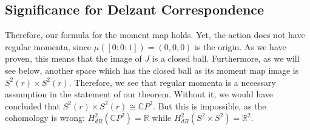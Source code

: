 \subsection{Significance for Delzant Correspondence}

\begin{remark}
Therefore, our formula for the moment map holds. Yet, the action does not have regular momenta, since $\mu([0:0:1]) = (0,0,0)$ is the origin. As we have proven, this means that the image of $J$ is a closed ball. Furthermore, as we will see below, another space which has the closed ball as its moment map image is $S^{2}(r) \times S^{2}(r)$. Therefore, we see that regular momenta is a necessary assumption in the statement of our theorem. Without it, we would have concluded that $S^{2}(r) \times S^{2}(r) \cong \mathbb{C}P^2$. But this is impossible, as the cohomology is wrong: $H^2_{dR}(\mathbb{C}P^2) = \mathbb{R}$ while $H^2_{dR}(S^2 \times S^2) = \mathbb{R}^2$.
\end{remark}



\newpage

\setcounter{section}{9}